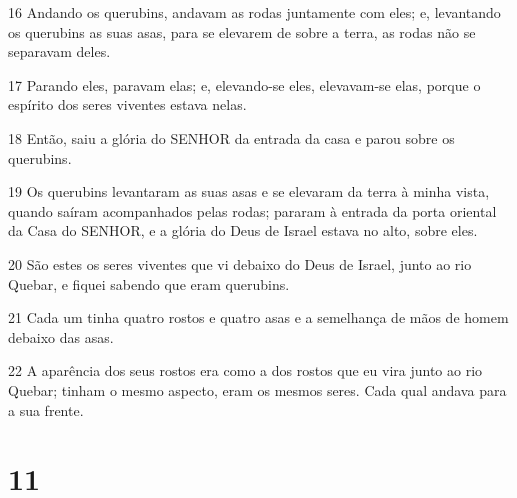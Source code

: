 \par 16 Andando os querubins, andavam as rodas juntamente com eles; e, levantando os querubins as suas asas, para se elevarem de sobre a terra, as rodas não se separavam deles.
\par 17 Parando eles, paravam elas; e, elevando-se eles, elevavam-se elas, porque o espírito dos seres viventes estava nelas.
\par 18 Então, saiu a glória do SENHOR da entrada da casa e parou sobre os querubins.
\par 19 Os querubins levantaram as suas asas e se elevaram da terra à minha vista, quando saíram acompanhados pelas rodas; pararam à entrada da porta oriental da Casa do SENHOR, e a glória do Deus de Israel estava no alto, sobre eles.
\par 20 São estes os seres viventes que vi debaixo do Deus de Israel, junto ao rio Quebar, e fiquei sabendo que eram querubins.
\par 21 Cada um tinha quatro rostos e quatro asas e a semelhança de mãos de homem debaixo das asas.
\par 22 A aparência dos seus rostos era como a dos rostos que eu vira junto ao rio Quebar; tinham o mesmo aspecto, eram os mesmos seres. Cada qual andava para a sua frente.

\chapter{11}

